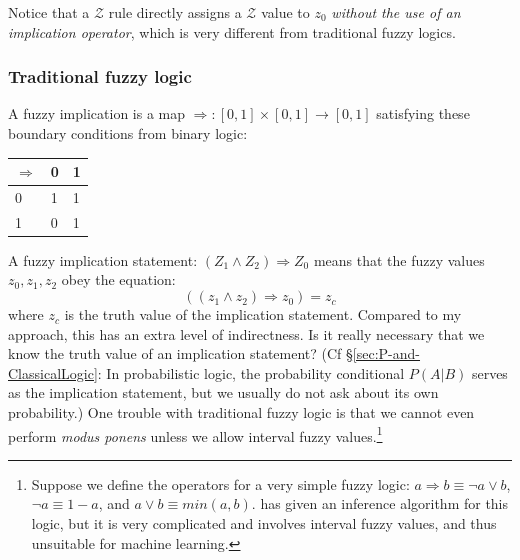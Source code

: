 Notice that a $\mathcal{Z}$ rule directly assigns a $\mathcal{Z}$ value to $z_0$ \textit{without the use of an implication operator}, which is very different from traditional fuzzy logics.

\subsubsection{Traditional fuzzy logic}

A fuzzy implication is a map $\Rightarrow: [0,1] \times [0,1] \rightarrow [0,1]$ satisfying these boundary conditions from binary logic:\\
\hspace*{1cm} \begin{tabular}{|l|l|l|} \hline
$\Rightarrow$ & 0 & 1\\ \hline
0             & 1 & 1\\
1             & 0 & 1\\ \hline
\end{tabular}

A fuzzy implication statement:  $(Z_1 \wedge Z_2) \Rightarrow Z_0$  means that the fuzzy values $z_0,z_1,z_2$ obey the equation:
$$ ((z_1 \wedge z_2) \Rightarrow z_0) = z_c $$
where $z_c$ is the truth value of the implication statement.  Compared to my approach, this has an extra level of indirectness.  Is it really necessary that we know the truth value of an implication statement?  (Cf \S\ref{sec:P-and-ClassicalLogic}: In probabilistic logic, the probability conditional $P(A|B)$ serves as the implication statement, but we usually do not ask about its own probability.)  One trouble with traditional fuzzy logic is that we cannot even perform \textit{modus ponens} unless we allow interval fuzzy values.\footnote{Suppose we define the operators for a very simple fuzzy logic: $a \Rightarrow b \equiv \neg a \vee b$, $\neg a \equiv 1-a $, and $a \vee b \equiv min(a,b)$.  \citep*{Kenevan1992} has given an inference algorithm for this logic, but it is very complicated and involves interval fuzzy values, and thus unsuitable for machine learning.}




